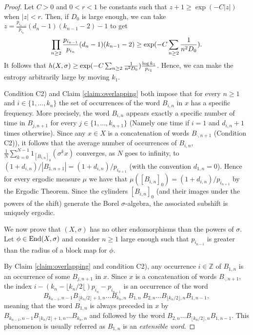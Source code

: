 \documentclass{daj}
\theoremstyle{plain}
\theoremstyle{definition}
\begin{document}
\begin{proof}
	
	
	
	Let  $C>0$ and $0< r <1$ be constants such that $z+1\geq \exp(-C|z|)$ when $|z| <r$. 
	Then, if $D_{0}$ is large enough, we can take 
	$z=\frac{p_{i_{n-1}}}{p_{i_{n}}}  (d_{n}-1)(k_{n-1}-2) -1$ to get
	$$\prod_{n\geq 2} \frac{p_{i_{n-1}}}{p_{i_{n}}}  (d_{n}-1)(k_{n-1}-2)  \ge {\rm exp }( -C\sum_{n\geq 2} \frac 1{n^{2}D_{0}}).$$ 
	It follows that 
	$h(X,\sigma) \ge  {\rm exp }( -C\sum_{n\geq 2} \frac 1{n^{2}D_{0}})\frac{\log k_{{1}}}{p_{i_{{1}}}}$. Hence, we can make the entropy arbitrarily large by moving $k_{1}$. 
	
	\medskip
	
	Condition C2) and Claim \ref{claim:overlapping} both  impose  that for every $n\geq 1$ and $i\in \{1,\ldots,k_n\}$ the set of occurrences of the  word $B_{i,n}$ in $x$ has a specific frequency. More precisely, the word $B_{i,n}$ appears exactly a specific number of time in $B_{j,n+1}$ for every $j  \in \{1,\ldots,  k_{n+1} \}$ (Namely one time if $i=1$ and $d_{i,n}+1$ times otherwise). Since any $x\in X$ is a concatenation of words $B_{\cdot, n+1}$ (Condition C2)), it follows that  the average number of occurrences of $B_{i,n}$,     $\frac{1}{N}\sum_{k=0}^{N-1} 1_{[B_{i,n}]_{0}}(\sigma^k x)$ converges, as $N$ goes to infinity,  to $(1+d_{i,n})/|B_{1,n+1}| = (1+d_{i,n})/p_{i_{n+1}}$ (with the convention $d_{1,n} = 0$). Hence for every ergodic measure $\mu$ we have that $\mu([B_{i,n}]_0)=(1+d_{i,n})/p_{i_{n+1}}$  by the Ergodic Theorem.  Since the cylinders $[B_{i,n}]_0$  (and their images under the powers of the shift) generate the Borel $\sigma$-algebra, the associated subshift is uniquely ergodic. 	
	\medskip
	
	We now prove that $(X,\sigma)$ has no other endomorphisms than the powers of $\sigma$. Let $\phi\in {\rm End}(X,\sigma)$ and consider $n\geq 1$ large enough such that 
	$p_{i_{n-1}}$ is greater than the radius of a block map for $\phi$.
	
	By Claim \ref{claim:overlapping} and condition C2), any occurrence  $i \in \mathbb{Z}$  of $B_{1,n}$ is an occurrence of some $B_{j, n+1}$ in $x$. Since $x$ is a concatenation of words $B_{\cdot, n+1}$, the index $i- (k_{n}- \lfloor k_{n}/2 \lfloor )p_{i_{n}} -p_{i_{n-1}}$ is an occurrence of the word 
	$$B_{k_{n-1}, n-1 }B_{\lfloor k_{n}/2 \rfloor +1, n }\ldots B_{k_{n},n} \ B_{1,n} \ B_{2,n} \ldots B_{\lfloor k_{n}/2 \rfloor, n }B_{1,n-1},$$
	meaning that the word $B_{1,n}$ is always preceded in $x$ by $B_{k_{n-1}, n-1 }B_{\lfloor k_{n}/2 \rfloor +1, n }\ldots B_{k_{n},n}$ and followed by the word $B_{2,n} \ldots B_{\lfloor k_{n}/2 \rfloor, n }B_{1,n-1}$. This phenomenon is usually referred as $B_{1,n}$ is an {\em extensible word}.  
	

\end{proof}
\end{document}
